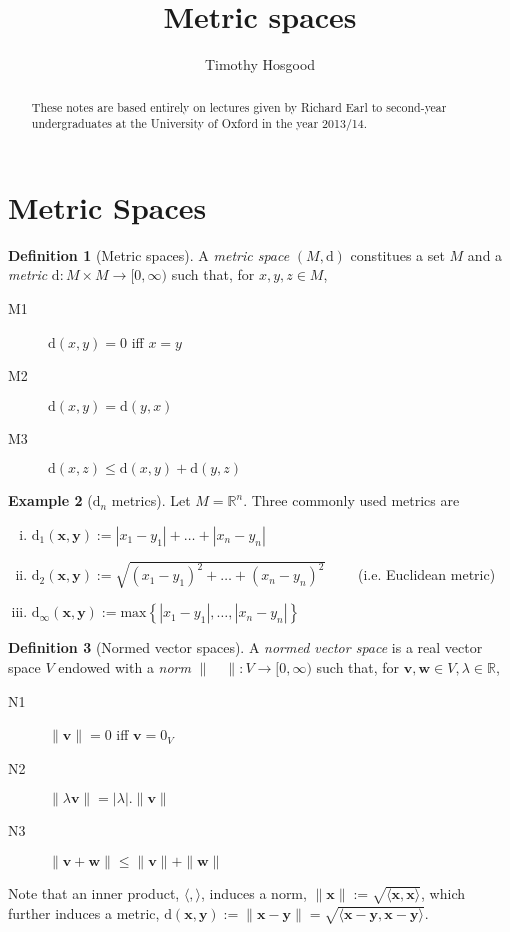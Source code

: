 \documentclass[10pt,fleqn]{article}
\author{Timothy Hosgood}
\title{Metric spaces}
\newcommand{\met}{\mathrm{d}}
\newcommand{\reals}{\mathbb{R}}
\newcommand{\vc}[1]{\boldsymbol{#1}}
\theoremstyle{definition} \newtheorem{defn}{Definition}[section]
\theoremstyle{plain}      \newtheorem{thm}[defn]{Theorem}
\theoremstyle{definition} \newtheorem{prop}[defn]{Proposition}
\theoremstyle{definition} \newtheorem{cor}[defn]{Corollary}
\theoremstyle{definition} \newtheorem{ex}[defn]{Example}
\theoremstyle{definition} \newtheorem{rem}[defn]{Remark}
\begin{document}
\maketitle
\begin{abstract}
    These notes are based entirely on lectures given by Richard Earl to second-year undergraduates at the University of Oxford in the year 2013/14.
\end{abstract}
\tableofcontents


\section{Metric Spaces}

\begin{defn}[Metric spaces]
    A \emph{metric space} $(M,\met)$ constitues a set $M$ and a \emph{metric} \mbox{$\met:M\times M\to[0,\infty)$} such that, for $x,y,z\in M$,
    \begin{description}
        \item[M1] $\met(x,y) = 0$ iff $x = y$
        \item[M2] $\met(x,y) = \met(y,x)$
        \item[M3] $\met(x,z) \leq \met(x,y) + \met(y,z)$
    \end{description}
\end{defn}

\begin{ex}[$\met_n$ metrics]
    Let $M=\reals^n$. Three commonly used metrics are
    \begin{enumerate}[(i)]
        \item $\met_1(\vc{x},\vc{y}) := |x_1-y_1| + \ldots + |x_n-y_n|$
        \item $\met_2(\vc{x},\vc{y}) := \sqrt{(x_1-y_1)^2 + \ldots + (x_n-y_n)^2}\qquad$ (i.e. Euclidean metric)
        \item $\met_{\infty}(\vc{x},\vc{y}) := \mathrm{max}\left\{|x_1-y_1|, \ldots, |x_n-y_n|\right\}$
    \end{enumerate}
\end{ex}

\begin{defn}[Normed vector spaces]
    A \emph{normed vector space} is a real vector space $V$ endowed with a \emph{norm} $\|\quad\|:V\to[0,\infty)$ such that, for $\vc{v},\vc{w}\in V, \lambda\in\reals$,
    \begin{description}
        \item[N1] $\|\vc{v}\| = 0$ iff $\vc{v}=0_V$
        \item[N2] $\|\lambda\vc{v}\| = |\lambda|.\|\vc{v}\|$
        \item[N3] $\|\vc{v}+\vc{w}\| \leq \|\vc{v}\|+\|\vc{w}\|$
    \end{description}
    Note that an inner product, $\langle,\rangle$, induces a norm, $\|\vc{x}\| := \sqrt{\langle\vc{x},\vc{x}\rangle}$, which further induces a metric, $\met(\vc{x},\vc{y}) := \|\vc{x}-\vc{y}\| = \sqrt{\langle\vc{x}-\vc{y},\vc{x}-\vc{y}\rangle}$.
\end{defn}
\end{document}
